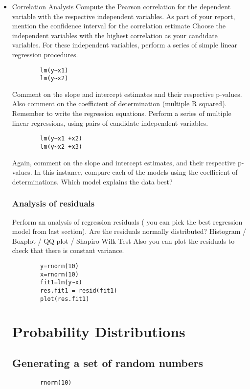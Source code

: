 \documentclass[a4paper,12pt]{article}
\begin{document}
\begin{itemize}
\begin{itemize}
		\item{Correlation Analysis}
		Compute the Pearson correlation for the dependent variable with the respective independent variables.  As part of your report, mention the confidence interval for the correlation estimate
		Choose the independent variables with the highest correlation as your candidate variables.
		For these independent variables, perform a series of simple linear regression procedures.
		\begin{verbatim}
		lm(y~x1)
		lm(y~x2)
		\end{verbatim}
		Comment on the slope and intercept estimates and their respective p-values. Also comment on the coefficient of determination (multiple R squared). Remember to write the regression equations.
		Perform a series of multiple linear regressions, using pairs of candidate independent variables.
		\begin{verbatim}
		lm(y~x1 +x2)
		lm(y~x2 +x3)
		\end{verbatim}
		Again, comment on the slope and intercept estimates, and their respective p-values.
		In this instance, compare each of the models using the coefficient of determinations. Which model explains the data best?
		\subsection{Analysis of residuals}
		Perform an analysis of regression residuals ( you can pick the best regression model from last section).
		Are the residuals normally distributed?
		Histogram /  Boxplot / QQ plot / Shapiro Wilk Test
		Also you can plot the residuals to check that there is constant variance.
		\begin{verbatim}
		y=rnorm(10)
		x=rnorm(10)
		fit1=lm(y~x)
		res.fit1 = resid(fit1)
		plot(res.fit1)
		\end{verbatim}
		
		
		
		
		\newpage
		\chapter{Probability Distributions}
		\section{Generating a set of random numbers}
		
		\large \begin{verbatim}
		rnorm(10)
		\end{verbatim}\large
		

\end{itemize}
\end{itemize}
\end{document}
